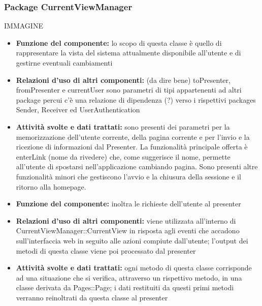 \documentclass[a4paper,11pt]{article}
\begin{document}
		     \subsubsection{Package CurrentViewManager}
			IMMAGINE		    
		    	\begin{itemize}
		    \item\textbf{Funzione del componente:} lo scopo di questa classe è quello di rappresentare la vista del sistema attualmente disponibile all'utente e di gestirne eventuali cambiamenti 
			\item\textbf{Relazioni d'uso di altri componenti:} (da dire bene) toPresenter, fromPresenter e currentUser sono parametri di tipi appartenenti ad altri package percui c'è una 
relazione di dipendenza (?) verso i rispettivi packages Sender, Receiver ed UserAuthentication
			\item\textbf{Attività svolte e dati trattati:} sono presenti dei parametri per la memorizzazione dell'utente corrente, della pagina corrente e per l'invio e la ricezione di informazioni dal Presenter. La funzionalità principale offerta è enterLink (nome da rivedere) che, come suggerisce il nome, permette all'utente di spostarsi nell'applicazione cambiando pagina. Sono presenti altre funzionalità minori che gestiscono l'avvio e la chiusura della sessione e il ritorno alla homepage.
			\end{itemize}
			\begin{itemize}
			\item\textbf{Funzione del componente:} inoltra le richieste dell'utente al presenter
			\item\textbf{Relazioni d'uso di altri componenti:}  viene utilizzata all'interno di CurrentViewManager::CurrentView in risposta agli eventi che accadono sull'interfaccia web in seguito alle azioni compiute dall'utente; l'output dei metodi di questa classe viene poi processato dal presenter
			\item\textbf{Attività svolte e dati trattati:} ogni metodo di questa classe corrisponde ad una situazione che si verifica, attraverso un rispettivo metodo, in una classe derivata da Pages::Page; i dati restituiti da questi primi metodi verranno reinoltrati da questa classe al presenter
			\end{itemize}
			
\end{document}
